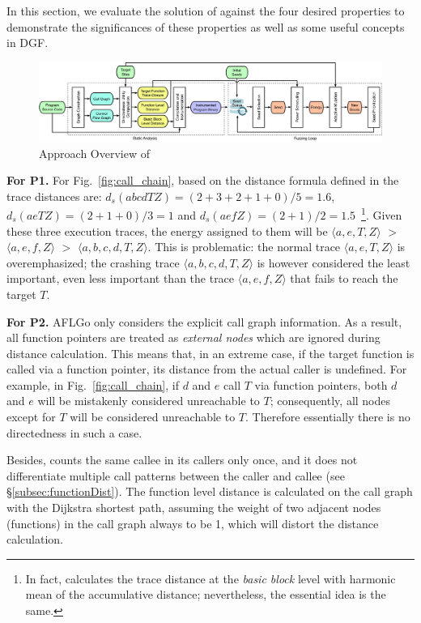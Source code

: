 In this section, we evaluate the solution of \aflgo against the four desired properties to demonstrate the significances of these properties as well as some useful concepts in DGF.





\begin{figure}[ht]
	\includegraphics[width=.99\columnwidth]{res/dfot/overview.pdf}
	\caption{Approach Overview of \dFOT}
	\label{fig:overview}
\end{figure}

\textbf{For P1.} 
For Fig.~\ref{fig:call_chain}, based on the distance formula defined in \aflgo
the trace distances are:  $d_s(abcdTZ)=(2+3+2+1+0)/5=1.6$, $d_s(aeTZ)=(2+1+0)/3=1$ and $d_s(aefZ)=(2+1)/2=1.5$~\footnote{In fact, \aflgo calculates the trace distance at the \emph{basic block} level with harmonic mean of the accumulative distance; nevertheless, the essential idea is the same.}. 
Given these three execution traces, the energy assigned to them will be $ \langle a, e, T, Z\rangle$ $>$ $\langle a, e, f , Z\rangle$ $>$ $\langle a, b, c, d, T, Z\rangle$.
This is problematic: the normal trace $\langle a, e, T, Z\rangle $ is overemphasized; the crashing trace $\langle a, b, c, d, T, Z\rangle$ is however considered the least important, even less important than the trace $\langle a, e, f , Z\rangle$ that fails to reach the target $T$.



\textbf{For P2.} AFLGo only considers the explicit call graph information.
As a result, all function pointers are treated as \emph{external nodes} which 
are ignored during distance calculation. 
This means that, in an extreme case, if the target function is called via a function pointer, its distance from the actual caller is undefined. 
For example, in Fig.~\ref{fig:call_chain}, if $d$ and $e$ call $T$ via function pointers, both $d$ and $e$ will be mistakenly considered unreachable to $T$; consequently, all nodes except for $T$ will be considered unreachable to $T$. Therefore essentially there is no directedness in such a case.


Besides, \aflgo counts the same callee in its callers only once, and it does not differentiate multiple call patterns between the caller and callee (see \S\ref{subsec:functionDist}).
The function level distance is calculated on the call graph with the Dijkstra shortest path, assuming the weight of two adjacent nodes (functions) in the call graph always to be 1, which will distort the distance calculation. 


